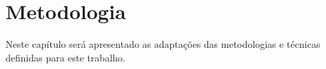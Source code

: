 \chapter{Metodologia}
\label{chap:metod}

Neste capítulo será apresentado as adaptações das metodologias e técnicas
definidas para este trabalho. 









